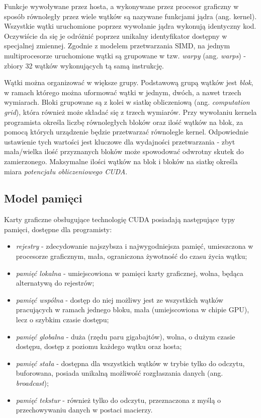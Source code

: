\documentclass[12pt]{article}
\begin{document}
Funkcje wywoływane przez hosta, a wykonywane przez procesor graficzny w sposób równoległy przez wiele wątków są nazywane funkcjami jądra (ang. kernel). Wszystkie wątki uruchomione poprzez wywołanie jądra wykonują identyczny kod. Oczywiście da się je odróżnić poprzez unikalny identyfikator dostępny w specjalnej zmiennej. Zgodnie z modelem przetwarzania SIMD, na jednym multiprocesorze uruchomione wątki są grupowane w tzw. \textit{warpy} (ang. \textit{warps}) - zbiory 32 wątków wykonujących tą samą instrukcję. 

Wątki można organizować w większe grupy. Podstawową grupą wątków jest \textit{blok}, w ramach którego można uformować wątki w jednym, dwóch, a nawet trzech wymiarach. Bloki grupowane są z kolei w siatkę obliczeniową (ang. \textit{computation grid}), która również może składać się z trzech wymiarów. Przy wywołaniu kernela programista określa liczbę równoległych bloków oraz ilość wątków na blok, za pomocą których urządzenie będzie przetwarzać równolegle kernel. Odpowiednie ustawienie tych wartości jest kluczowe dla wydajności przetwarzania - zbyt mała/wielka ilość przyznanych bloków może spowodować odwrotny skutek do zamierzonego. Maksymalne ilości wątków na blok i bloków na siatkę określa miara \textit{potencjału obliczeniowego CUDA}. 

\subsection{Model pamięci}

Karty graficzne obsługujące technologię CUDA posiadają następujące typy pamięci, dostępne dla programisty:

\begin{itemize}
\item \textit{rejestry} - zdecydowanie najszybsza i najwygodniejsza pamięć, umieszczona w procesorze graficznym, mała, ograniczona żywotność do czasu życia wątku;
\item \textit{pamięć lokalna} - umiejscowiona w pamięci karty graficznej, wolna, będąca alternatywą do rejestrów;
\item \textit{pamięć wspólna} - dostęp do niej możliwy jest ze wszystkich wątków pracujących w ramach jednego bloku, mała (umiejscowiona w chipie GPU), lecz o szybkim czasie dostępu;
\item \textit{pamięć globalna} - duża (rzędu paru gigabajtów), wolna, o dużym czasie dostępu, dostęp z poziomu każdego wątku oraz hosta;
\item \textit{pamięć stała} - dostępna dla wszystkich wątków w trybie tylko do odczytu, buforowana, posiada unikalną możliwość rozgłaszania danych (ang. \textit{broadcast});
\item \textit{pamięć tekstur} - również tylko do odczytu, przeznaczona z myślą o przechowywaniu danych w postaci macierzy.
\end{itemize}
\end{document}
